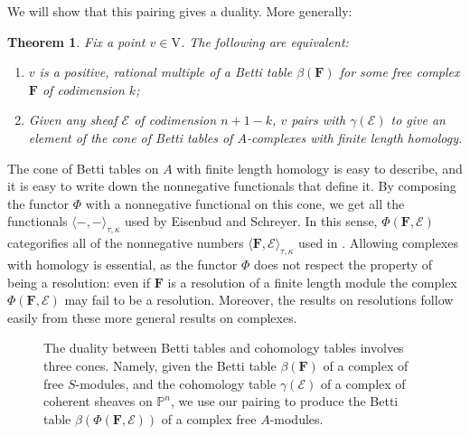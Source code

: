 \documentclass[12pt]{amsart}
\newtheorem{thm}[lemma]{Theorem}
\theoremstyle{definition}
\theoremstyle{remark}
\newcommand{\PP}{\mathbb{P}}
\newcommand{\VV}{\mathrm{V}}
\newcommand{\cE}{\mathcal{E}}
\newcommand{\FF}{\mathbf{F}}
\begin{document}
We will show that this pairing gives a duality. More generally: 
\begin{thm}\label{thm:duality}
Fix a point $v\in \VV$.   The following are equivalent:
\begin{enumerate}
	\item   $v$ is a positive, rational multiple of a Betti table $\beta(\FF)$ for some free complex $\FF$ of codimension $k$;
	\item  Given any sheaf $\cE$ of codimension $n+1-k$, $v$ pairs with $\gamma(\cE)$ to give an element of the cone of Betti tables of $A$-complexes with finite length homology.
\end{enumerate}
\end{thm}

The cone of Betti tables on $A$ with finite length homology is easy to describe, and it is easy to write down the nonnegative functionals that define it.
By composing the functor $\Phi$ with a nonnegative functional on this cone, we get all the functionals $\langle -,-\rangle_{\tau,\kappa}$ used by Eisenbud and Schreyer. In this sense, $\Phi(\FF,\cE)$ categorifies all of the nonnegative numbers $\langle \FF, \cE\rangle_{\tau,\kappa}$ used in \cite{eis-schrey1}. Allowing complexes with homology is essential, as the functor $\Phi$ does not respect the property of being a resolution: even if $\FF$ is a resolution of a finite length module the complex $\Phi(\FF,\cE)$ may fail to be a resolution. Moreover, the results on resolutions follow easily from these more general results on complexes.


\begin{figure}
\caption{The duality between Betti tables and cohomology tables involves three cones.  Namely, given the Betti table $\beta(\FF)$ of a complex of free $S$-modules, and the cohomology table $\gamma(\cE)$ of a complex of coherent sheaves on $\PP^n$, we use our pairing to produce the Betti table $\beta(\Phi(\FF,\cE))$ of a complex free $A$-modules. 
}
\label{fig:bracket}
\end{figure}
\end{document}
